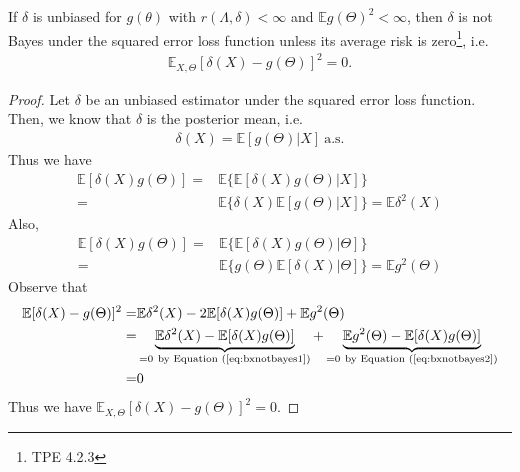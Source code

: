 \begin{theorem}\label{thm:uenotbayes}
    If $\delta$ is unbiased for $g(\theta)$ with $r(\Lambda,\delta)<\infty$ and $\mathbb{E}g(\Theta)^2<\infty$,
    then $\delta$ is not Bayes under the squared error loss function unless its average risk is zero\footnote{TPE 4.2.3}, i.e.
    \begin{gather}
        \mathbb{E}_{X,\Theta}[\delta(X)-g(\Theta)]^2=0.
    \end{gather}
\end{theorem}
\begin{proof}
    Let $\delta$ be an unbiased estimator under the squared error loss function.
    Then, we know that $\delta$ is the posterior mean, i.e.
    \begin{gather}
        \delta(X)=\mathbb{E}[g(\Theta)|X]~\text{a.s.}
    \end{gather}
    Thus we have
    \begin{align}
        \mathbb{E}[\delta(X)g(\Theta)]
        =& \mathbb{E}\{\mathbb{E}[\delta(X)g(\Theta)|X]\}\\
        =& \mathbb{E}\{\delta(X)\mathbb{E}[g(\Theta)|X]\}
        = \mathbb{E}\delta^2(X)\label{eq:bxnotbayes1}
    \end{align}
    Also,
    \begin{align}
        \mathbb{E}[\delta(X)g(\Theta)]
        =& \mathbb{E}\{\mathbb{E}[\delta(X)g(\Theta)|\Theta]\}\\
        =& \mathbb{E}\{g(\Theta)\mathbb{E}[\delta(X)|\Theta]\}
        = \mathbb{E}g^2(\Theta)\label{eq:bxnotbayes2}
    \end{align}
    Observe that
    \begin{align}
        \mathbb{E}[\delta(X)-g(\Theta)]^2
        =& \mathbb{E}\delta^2(X)-2\mathbb{E}[\delta(X)g(\Theta)]+\mathbb{E}g^2(\Theta)\\
        =& \underbrace{\mathbb{E}\delta^2(X)-\mathbb{E}[\delta(X)g(\Theta)]}_{=0~\text{by Equation (\ref{eq:bxnotbayes1})}}
        + \underbrace{\mathbb{E}g^2(\Theta)-\mathbb{E}[\delta(X)g(\Theta)]}_{=0~\text{by Equation (\ref{eq:bxnotbayes2})}}\\
        =& 0
    \end{align}
    Thus we have $\mathbb{E}_{X,\Theta}[\delta(X)-g(\Theta)]^2=0$.
\end{proof}

